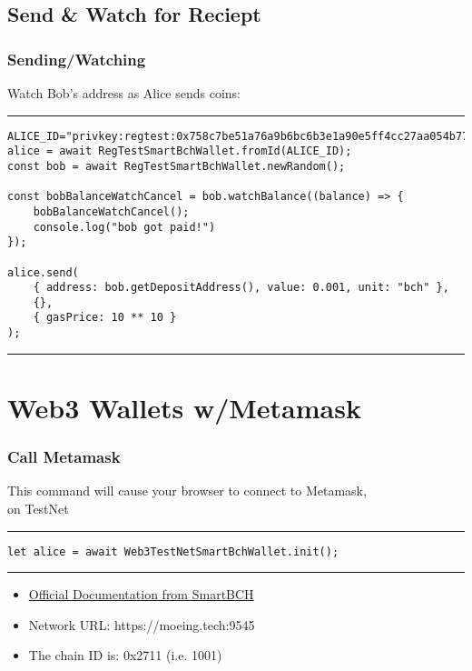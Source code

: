 \documentclass{beamer}
\begin{document}
\subsection[Sending sBCH]{Send \& Watch for Reciept}
\begin{frame}[fragile]
    \frametitle{Sending/Watching}
    Watch Bob's address as Alice sends coins:
    \rule{\textwidth}{0.9pt}
    \tiny
    \begin{verbatim}
ALICE_ID="privkey:regtest:0x758c7be51a76a9b6bc6b3e1a90e5ff4cc27aa054b77b7acb6f4f08a219c1ce45"
alice = await RegTestSmartBchWallet.fromId(ALICE_ID);
const bob = await RegTestSmartBchWallet.newRandom();

const bobBalanceWatchCancel = bob.watchBalance((balance) => {
    bobBalanceWatchCancel();
    console.log("bob got paid!")
});

alice.send(
    { address: bob.getDepositAddress(), value: 0.001, unit: "bch" },
    {},
    { gasPrice: 10 ** 10 }
);
    \end{verbatim}
\rule{\textwidth}{0.9pt}
\end{frame}





\section[Web3 Wallets]{Web3 Wallets w/Metamask}


\begin{frame}[fragile]
    \frametitle{Call Metamask}
    This command will cause your browser to connect to Metamask, \\ on TestNet
    \rule{\textwidth}{0.9pt}
    \tiny
    \begin{verbatim}
let alice = await Web3TestNetSmartBchWallet.init();
    \end{verbatim}
\rule{\textwidth}{0.9pt}
\begin{itemize}
\item   \href{https://docs.smartbch.org/smartbch/testnets}{Official Documentation from SmartBCH}
\item    Network URL: https://moeing.tech:9545
\item    The chain ID is: 0x2711 (i.e. 1001)
\end{itemize}
\end{frame}
\end{document}
